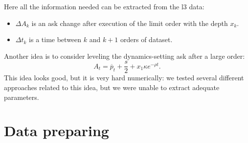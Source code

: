Here all the information needed can be extracted from the l3 data: 
\begin{itemize}
    \item $\Delta A_{k}$ is an ask change after execution of the limit order with the depth $x_k$.
    \item $\Delta t_{k}$ is a time between $k$ and $k + 1$ orders of dataset.
\end{itemize}

Another idea is to consider leveling the dynamics-setting ask after a large order:
\begin{equation*}
        A_t = \overline p _t + \frac{s}{2} + x_1 \kappa e^{- \rho t}.
\end{equation*}
This idea looks good, but it is very hard numerically: we tested several different approaches related to this idea, but we were unable 
to extract adequate parameters.


\section{Data preparing}

